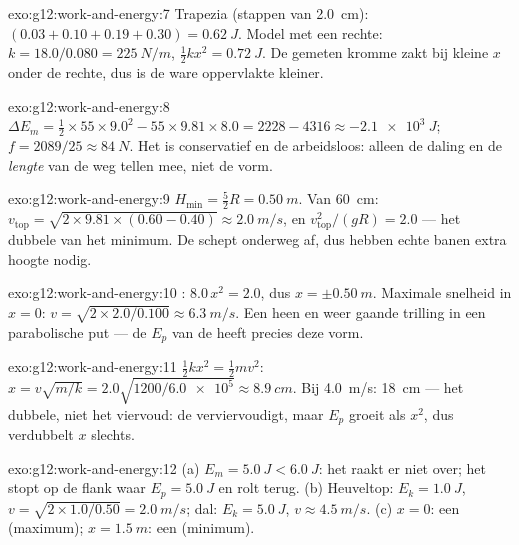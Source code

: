 \begin{solution}{exo:g12:work-and-energy:7}
Trapezia (stappen van \qty{2.0}{cm}): $(0.03 + 0.10 + 0.19 + 0.30) =
\qty{0.62}{J}$. Model met een rechte: $k = 18.0/0.080 = \qty{225}{N/m}$,
$\tfrac12 kx^2 = \qty{0.72}{J}$. De gemeten kromme zakt bij kleine $x$ onder
de rechte, dus is de ware oppervlakte kleiner.
\end{solution}

\begin{solution}{exo:g12:work-and-energy:8}
$\Delta E_m = \tfrac12 \times 55 \times 9.0^2 - 55 \times 9.81 \times
8.0 = 2228 - 4316 \approx \qty{-2.1e3}{J}$;
$f = 2089/25 \approx \qty{84}{N}$. Het  is conservatief en de
 arbeidsloos: alleen de daling en de \emph{lengte} van de weg
tellen mee, niet de vorm.
\end{solution}

\begin{solution}{exo:g12:work-and-energy:9}
$H_{\min} = \tfrac52 R = \qty{0.50}{m}$. Van \qty{60}{cm}:
$v_{\text{top}} = \sqrt{2 \times 9.81 \times (0.60 - 0.40)} \approx
\qty{2.0}{m/s}$, en $v_{\text{top}}^2/(gR) = 2.0$ --- het dubbele van het
minimum. De  schept onderweg  af, dus hebben echte banen extra
hoogte nodig.
\end{solution}

\begin{solution}{exo:g12:work-and-energy:10}
: $8.0\,x^2 = 2.0$, dus $x = \pm\qty{0.50}{m}$. Maximale snelheid in
$x = 0$: $v = \sqrt{2 \times 2.0/0.100} \approx \qty{6.3}{m/s}$. Een heen en
weer gaande trilling in een parabolische put --- de $E_p$ van de 
heeft precies deze vorm.
\end{solution}

\begin{solution}{exo:g12:work-and-energy:11}
$\tfrac12 kx^2 = \tfrac12 mv^2$:
$x = v\sqrt{m/k} = 2.0\sqrt{1200/\num{6.0e5}} \approx \qty{8.9}{cm}$. Bij
\qty{4.0}{m/s}: \qty{18}{cm} --- het dubbele, niet het viervoud: de 
verviervoudigt, maar $E_p$ groeit als $x^2$, dus verdubbelt $x$ slechts.
\end{solution}

\begin{solution}{exo:g12:work-and-energy:12}
(a) $E_m = \qty{5.0}{J} < \qty{6.0}{J}$: het raakt er niet over; het stopt op
de flank waar $E_p = \qty{5.0}{J}$ en rolt terug. (b) Heuveltop:
$E_k = \qty{1.0}{J}$, $v = \sqrt{2 \times 1.0/0.50} = \qty{2.0}{m/s}$; dal:
$E_k = \qty{5.0}{J}$, $v \approx \qty{4.5}{m/s}$. (c) $x = 0$: een  (maximum); $x = \qty{1.5}{m}$: een  (minimum).
\end{solution}

